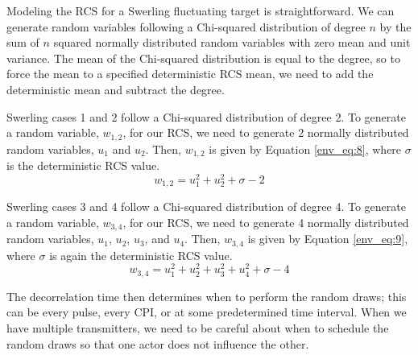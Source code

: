 Modeling the RCS for a Swerling fluctuating target is straightforward. We can generate random variables following a Chi-squared distribution of degree $n$ by the sum of $n$ squared normally distributed random variables with zero mean and unit variance. The mean of the Chi-squared distribution is equal to the degree, so to force the mean to a specified deterministic RCS mean, we need to add the deterministic mean and subtract the degree.

Swerling cases 1 and 2 follow a Chi-squared distribution of degree 2. To generate a random variable, $w_{1,2}$, for our RCS, we need to generate 2 normally distributed random variables, $u_1$ and $u_2$. Then, $w_{1,2}$ is given by Equation \ref{env_eq:8}, where $\sigma$ is the deterministic RCS value.
\begin{equation}
  \label{env_eq:8}
w_{1,2} = u_1^2 + u_2^2 + \sigma - 2
  \end{equation}

Swerling cases 3 and 4 follow a Chi-squared distribution of degree 4. To generate a random variable, $w_{3,4}$, for our RCS, we need to generate 4 normally distributed random variables, $u_1$, $u_2$, $u_3$, and $u_4$. Then, $w_{3,4}$ is given by Equation \ref{env_eq:9}, where $\sigma$ is again the deterministic RCS value.
\begin{equation}
  \label{env_eq:9}
w_{3,4} = u_1^2 + u_2^2 + u_3^2 + u_4^2 + \sigma - 4
  \end{equation}
  
The decorrelation time then determines when to perform the random draws; this can be every pulse, every CPI, or at some predetermined time interval. When we have multiple transmitters, we need to be careful about when to schedule the random draws so that one actor does not influence the other.  